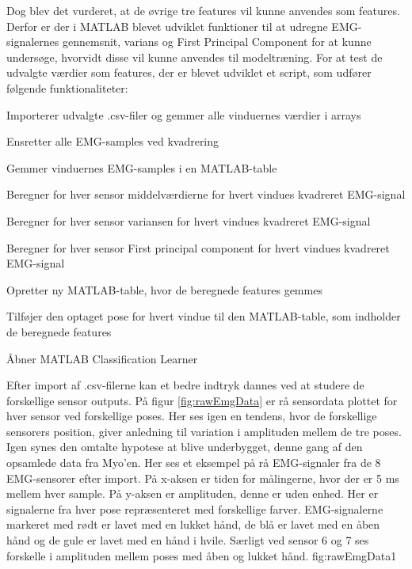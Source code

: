 Dog blev det vurderet, at de øvrige tre features vil kunne anvendes som features. Derfor er der i MATLAB blevet udviklet funktioner til at udregne EMG-signalernes gennemsnit, varians og First Principal Component for at kunne undersøge, hvorvidt disse vil kunne anvendes til modeltræning.  
For at test de udvalgte værdier som features, der er blevet udviklet et script, som udfører følgende funktionaliteter:
\begin{myItemize}
\item Importerer udvalgte .csv-filer og gemmer alle vinduernes værdier i arrays
\item Ensretter alle EMG-samples ved kvadrering 
\item Gemmer vinduernes EMG-samples i en MATLAB-table
\item Beregner for hver sensor middelværdierne for hvert vindues kvadreret EMG-signal
\item Beregner  for hver sensor variansen for hvert vindues kvadreret EMG-signal
\item Beregner  for hver sensor First principal component for hvert vindues kvadreret EMG-signal
\item Opretter ny MATLAB-table, hvor de beregnede features gemmes
\item Tilføjer den optaget pose for hvert vindue til den MATLAB-table, som indholder de beregnede features
\item Åbner MATLAB Classification Learner\citep{matlabClassificationLearner}
\end{myItemize}
Efter import af .csv-filerne kan et bedre indtryk dannes ved at studere de forskellige sensor outputs. På figur \ref{fig:rawEmgData} er rå sensordata plottet for hver sensor ved forskellige poses. Her ses igen en tendens, hvor de forskellige sensorers position, giver anledning til variation i amplituden mellem de tre poses. Igen synes den omtalte hypotese at blive underbygget, denne gang af den opsamlede data fra Myo'en.
{
	Her ses et eksempel på rå EMG-signaler fra de 8 EMG-sensorer efter import. På x-aksen er tiden for målingerne, hvor der er 5 ms mellem hver sample. På y-aksen er amplituden, denne er uden enhed. Her er signalerne fra hver pose repræsenteret med forskellige farver. EMG-signalerne markeret med rødt er lavet med en lukket hånd, de blå er lavet med en åben hånd og de gule er lavet med en hånd i hvile. Særligt ved sensor 6 og 7 ses forskelle i amplituden mellem poses med åben og lukket hånd. 
 }{fig:rawEmgData}{1}
